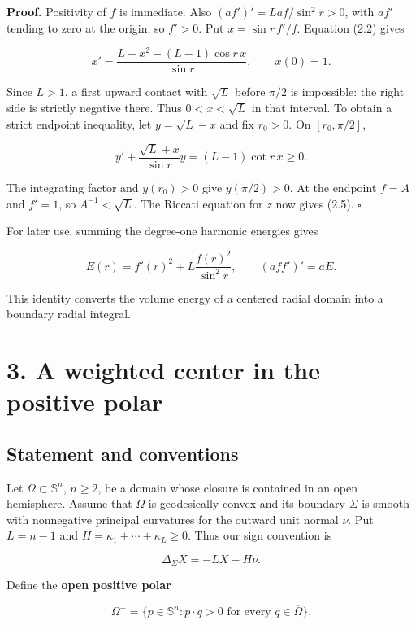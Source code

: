 \documentclass[11pt]{article}
\begin{document}
\textbf{Proof.} Positivity of \(f\) is immediate. Also
\((af')'=Laf/\sin^2r>0\), with \(af'\) tending to zero at the origin, so
\(f'>0\). Put \(x=\sin r\,f'/f\). Equation (2.2) gives

\[
x'=\frac{L-x^2-(L-1)\cos r\,x}{\sin r},
\qquad x(0)=1.
\tag{2.6}
\]

Since \(L>1\), a first upward contact with \(\sqrt L\) before \(\pi/2\)
is impossible: the right side is strictly negative there. Thus
\(0<x<\sqrt L\) in that interval. To obtain a strict endpoint
inequality, let \(y=\sqrt L-x\) and fix \(r_0>0\). On \([r_0,\pi/2]\),

\[
y'+\frac{\sqrt L+x}{\sin r}y=(L-1)\cot r\,x\geq0.
\tag{2.7}
\]

The integrating factor and \(y(r_0)>0\) give \(y(\pi/2)>0\). At the
endpoint \(f=A\) and \(f'=1\), so \(A^{-1}<\sqrt L\). The Riccati
equation for \(z\) now gives (2.5). \(\square\)

For later use, summing the degree-one harmonic energies gives

\[
E(r)=f'(r)^2+L\frac{f(r)^2}{\sin^2r},
\qquad (aff')'=aE.
\tag{2.8}
\]

This identity converts the volume energy of a centered radial domain
into a boundary radial integral.

\section{3. A weighted center in the positive
polar}\label{a-weighted-center-in-the-positive-polar}

\subsection{Statement and conventions}\label{statement-and-conventions}

Let \(\Omega\subset\mathbb S^n\), \(n\geq2\), be a domain whose closure
is contained in an open hemisphere. Assume that \(\Omega\) is
geodesically convex and its boundary \(\Sigma\) is smooth with
nonnegative principal curvatures for the outward unit normal \(\nu\).
Put \(L=n-1\) and \(H=\kappa_1+\cdots+\kappa_L\geq0\). Thus our sign
convention is

\[
\Delta_\Sigma X=-LX-H\nu.
\tag{3.1}
\]

Define the \textbf{open positive polar}

\[
\Omega^+=\{p\in\mathbb S^n:p\cdot q>0\text{ for every }q\in\overline\Omega\}.
\tag{3.2}
\]
\end{document}
